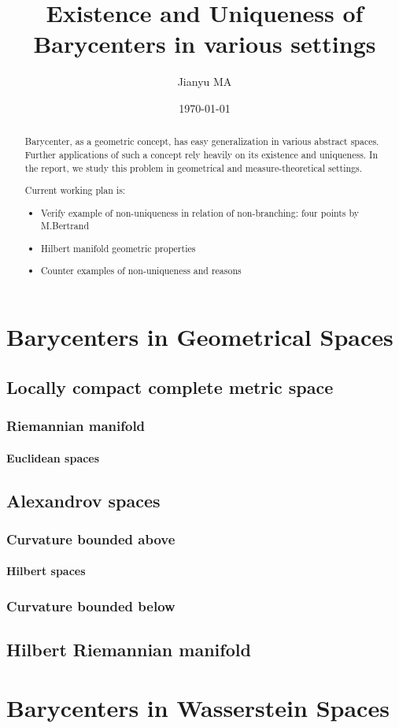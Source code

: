 \documentclass{report}
\title{Existence and Uniqueness of Barycenters in various settings}
\author{Jianyu MA}
\date{\today}
\theoremstyle{remark}
\theoremstyle{definition}
\begin{document}
\maketitle

\begin{abstract}
	Barycenter, as a geometric concept, has easy generalization in various abstract spaces. Further applications of such a concept rely heavily on its existence and uniqueness. In the report, we study this problem in geometrical and measure-theoretical settings.

	Current working plan is:
	\begin{itemize}
		\item Verify example of non-uniqueness in relation of non-branching: four points by M.Bertrand
		\item Hilbert manifold geometric properties
		\item Counter examples of non-uniqueness and reasons
	\end{itemize}
\end{abstract}

\tableofcontents
{}


\part{Barycenters in Geometrical Spaces}

\chapter{Locally compact complete metric space}

\section{Riemannian manifold}
\subsection{Euclidean spaces}

\chapter{Alexandrov spaces}
\section{Curvature bounded above}
\subsection{Hilbert spaces}
\section{Curvature bounded below}

\chapter{Hilbert Riemannian manifold}

\part{Barycenters in Wasserstein Spaces}

\printbibliography
\end{document}
